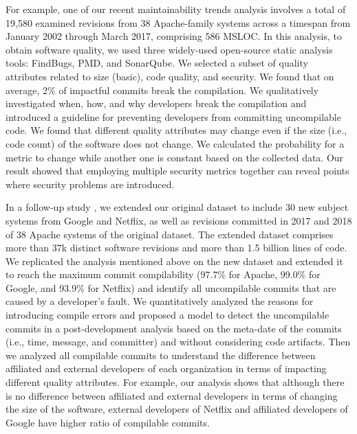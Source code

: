 For example,
one of our recent maintainability trends analysis \cite{Behnamghader2017qrs} involves a total of 19,580 examined revisions from 38 Apache-family systems across a timespan from January 2002 through March 2017, comprising 586 MSLOC.
In this analysis, to obtain software quality, we used three widely-used open-source static analysis tools: FindBugs, PMD, and SonarQube.
We selected a subset of quality attributes related to size (basic), code quality, and security.
We found that on average, 2\% of impactful commits break the compilation.
We qualitatively investigated when, how, and why developers break the compilation and introduced a guideline for preventing developers from committing uncompilable code.
We found that different quality attributes may change even if the size (i.e., code count) of the software does not change.
We calculated the probability for a metric to change while another one is constant based on the collected data.
Our result showed that employing multiple security metrics together can reveal points where security problems are introduced.

In a follow-up study \cite{Behnamghader2018esem}, we extended our original dataset to include 30 new subject systems from Google and Netflix, as well as revisions committed in 2017 and 2018 of 38 Apache systems of the original dataset.
The extended dataset comprises more than 37k distinct software revisions and more than 1.5 billion lines of code.
We replicated the analysis mentioned above on the new dataset and extended it to reach the maximum commit compilability (97.7\% for Apache, 99.0\% for Google, and 93.9\% for Netflix) and identify all uncompilable commits that are caused by a developer's fault.
We quantitatively analyzed the reasons for introducing compile errors and proposed a model to detect the uncompilable commits in a post-development analysis based on the meta-date of the commits (i.e., time, message, and committer) and without considering code artifacts.
Then we analyzed all compilable commits to understand the difference between affiliated and external developers of each organization in terms of impacting different quality attributes. 
For example, our analysis shows that although there is no difference between affiliated and external developers in terms of changing the size of the software, external developers of Netflix and affiliated developers of Google have higher ratio of compilable commits.

